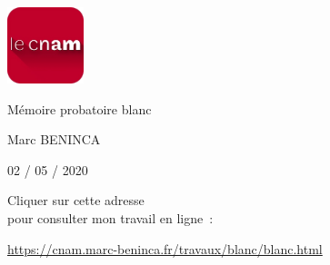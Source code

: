 \documentclass[20pt]{extarticle}
\begin{document}
\begin{titlepage}

\begin{center}

\includegraphics[height=6em]{cnam.png}

{\bfseries

\huge{Mémoire probatoire blanc}

\large{Marc BENINCA}

\large{02 / 05 / 2020}

}

\end{center}

Cliquer sur cette adresse\\
pour consulter mon travail en ligne :

\url{https://cnam.marc-beninca.fr/travaux/blanc/blanc.html}

\end{titlepage}
\end{document}
